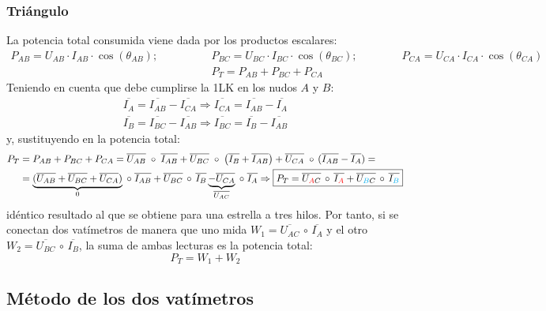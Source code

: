 \documentclass[11pt]{book} %
\begin{document}
	\subsubsection{Triángulo}
	
	La potencia total consumida viene dada por los productos escalares: 
	\begin{align*}
	    P_{AB}=U_{AB}\cdot I_{AB} \cdot \cos(\theta_{AB});\qquad \qquad
	    &P_{BC}=U_{BC}\cdot I_{BC} \cdot \cos(\theta_{BC});\qquad \qquad
	    P_{CA}=U_{CA}\cdot I_{CA} \cdot \cos(\theta_{CA})\\
	    &P_T=P_{AB}+P_{BC}+P_{CA}
	\end{align*}
	Teniendo en cuenta que debe cumplirse la 1LK en los nudos $A$ y $B$:
	\begin{align*}
	    \overline{I_A}=\overline{I_{AB}}-\overline{I_{CA}}\Rightarrow \overline{I_{CA}}=\overline{I_{AB}}-\overline{I_A}\\
	    \overline{I_B}=\overline{I_{BC}}-\overline{I_{AB}}\Rightarrow \overline{I_{BC}}=\overline{I_{B}}-\overline{I_{AB}}
	\end{align*}
	y, sustituyendo en la potencia total:
		\begin{align}
	    P_T&=P_{AB}+P_{BC}+P_{CA}=\overline{U_{AB}}\;\circ\; \overline{I_{AB}} + \overline{U_{BC}}\;\circ\;\left(\overline{I_B}+\overline{I_{AB}} \right)  + \overline{U_{CA}}\;\circ\,(\overline{I_{AB}}-\overline{I_A})=\nonumber \\
	    & =\underbrace{(\overline{U_{AB}}+\overline{U_{BC}}+\overline{U_{CA}})}_{0}\;\circ\; \overline{I_{AB}}+\overline{U_{BC}}\,\circ\,\overline{I_B}\underbrace{-\overline{U_{CA}}}_{\overline{U_{AC}}}\;\circ\; \overline{I_A}\Rightarrow \boxed{P_T=\overline{U_{\textcolor{red}{A}C}}\,\circ\,\overline{I_{\textcolor{red}{A}}}+\overline{U_{\textcolor{cyan}{B}C}}\,\circ\,\overline{I_{\textcolor{cyan}{B}}}}
	\end{align}
	idéntico resultado al que se obtiene para una estrella a tres hilos. Por tanto, si se conectan dos vatímetros de manera que uno mida $W_1=\overline{U_{AC}}\,\circ\,\overline{I_A}$ y el otro $W_2=\overline{U_{BC}}\,\circ\,\overline{I_B}$, la suma de ambas lecturas es la potencia total: 
	\begin{equation*}
	    P_T=W_1+W_2
	\end{equation*}
	
	\subsection{Método de los dos vatímetros}\label{sec.dos_vat}
	
\end{document}
